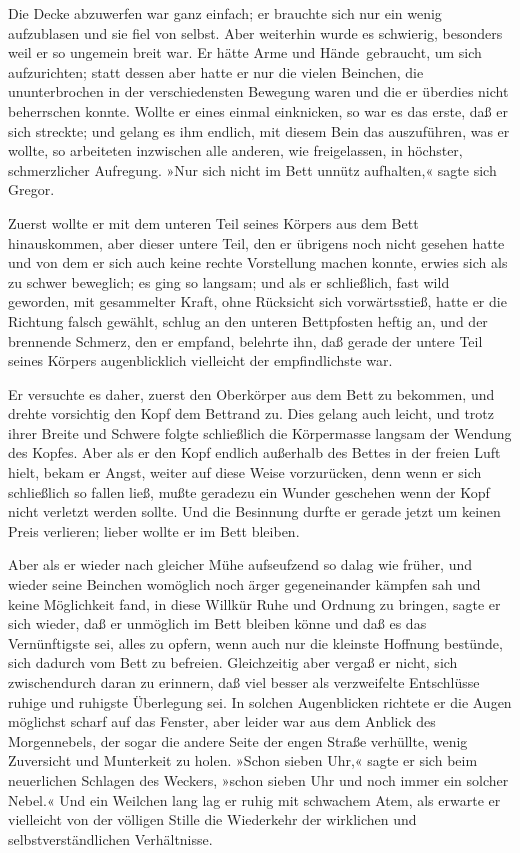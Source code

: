 Die Decke abzuwerfen war ganz einfach; er brauchte sich nur ein wenig
aufzublasen und sie fiel von selbst. Aber weiterhin wurde es schwierig,
besonders weil er so ungemein breit war. Er hätte Arme und Hände\est\
gebraucht, um sich aufzurichten; statt dessen aber hatte er nur die
vielen Beinchen, die ununterbrochen in der verschiedensten Bewegung
waren und die er überdies nicht beherrschen konnte. Wollte er eines
einmal einknicken, so war es das erste, daß er sich streckte; und gelang
es ihm endlich, mit diesem Bein das auszuführen, was er wollte, so
arbeiteten inzwischen alle anderen, wie freigelassen, in höchster,
schmerzlicher Aufregung. »Nur sich nicht im Bett unnütz aufhalten,«
sagte sich Gregor.

Zuerst wollte er mit dem unteren Teil seines Körpers aus dem Bett
hinauskommen, aber dieser untere Teil, den er übrigens noch nicht
gesehen hatte und von dem er sich auch keine rechte Vorstellung machen
konnte, erwies sich als zu schwer beweglich; es ging so langsam; und als
er schließlich, fast wild geworden, mit gesammelter Kraft, ohne
Rücksicht sich vorwärtsstieß, hatte er die Richtung falsch gewählt,
schlug an den unteren Bettpfosten heftig an, und der brennende Schmerz,
den er empfand, belehrte ihn, daß gerade der untere Teil seines Körpers
augenblicklich vielleicht der empfindlichste war.

Er versuchte es daher, zuerst den Oberkörper aus dem Bett zu bekommen,
und drehte vorsichtig den Kopf dem Bettrand zu. Dies gelang auch leicht,
und trotz ihrer Breite und Schwere folgte schließlich die Körpermasse
langsam der Wendung des Kopfes. Aber als er den Kopf endlich außerhalb
des Bettes in der freien Luft hielt, bekam er Angst, weiter auf diese
Weise vorzurücken, denn wenn er sich schließlich so fallen ließ, mußte
geradezu ein Wunder geschehen wenn der Kopf nicht verletzt werden
sollte. Und die Besinnung durfte er gerade jetzt um keinen Preis
verlieren; lieber wollte er im Bett bleiben.

Aber als er wieder nach gleicher Mühe aufseufzend so dalag wie früher,
und wieder seine Beinchen womöglich noch ärger gegeneinander kämpfen sah
und keine Möglichkeit fand, in diese Willkür Ruhe und Ordnung zu
bringen, sagte er sich wieder, daß er unmöglich im Bett bleiben könne
und daß es das Vernünftigste sei, alles zu opfern, wenn auch nur die
kleinste Hoffnung bestünde, sich dadurch vom Bett zu befreien.
Gleichzeitig aber vergaß er nicht, sich zwischendurch daran zu erinnern,
daß viel besser als verzweifelte Entschlüsse ruhige und ruhigste
Überlegung sei. In solchen Augenblicken richtete er die Augen möglichst
scharf auf das Fenster, aber leider war aus dem Anblick des
Morgennebels, der sogar die andere Seite der engen Straße verhüllte,
wenig Zuversicht und Munterkeit zu holen. »Schon sieben Uhr,« sagte er
sich beim neuerlichen Schlagen des Weckers, »schon sieben Uhr und noch
immer ein solcher Nebel.« Und ein Weilchen lang lag er ruhig mit
schwachem Atem, als erwarte er vielleicht von der völligen Stille die
Wiederkehr der wirklichen und selbstverständlichen Verhältnisse.

